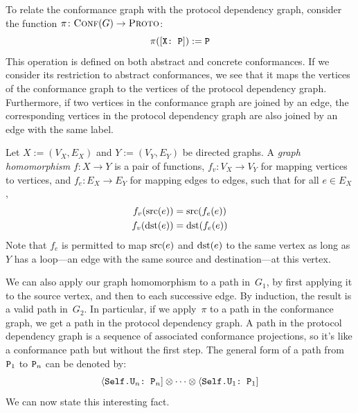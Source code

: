 \documentclass[../generics]{subfiles}
\begin{document}
To relate the conformance graph with the protocol dependency graph, consider the function $\pi\colon\textsc{Conf}({G})\rightarrow\textsc{Proto}$:
\[\pi([\texttt{X:~P}]):=\texttt{P}\]
This operation is defined on both abstract and concrete conformances. If we consider its restriction to abstract conformances, we see that it maps the vertices of the conformance graph to the vertices of the protocol dependency graph. Furthermore, if two vertices in the conformance graph are joined by an edge, the corresponding vertices in the protocol dependency graph are also joined by an edge with the same label.

\begin{definition}
Let $X:=(V_X,E_X)$ and $Y:=(V_Y,E_Y)$ be directed graphs. A \emph{graph homomorphism} $f\colon X\rightarrow Y$ is a pair of functions, $f_v\colon V_X\rightarrow V_Y$ for mapping vertices to vertices, and $f_e\colon E_X\rightarrow E_Y$ for mapping edges to edges, such that for all $e\in E_X$,
\begin{gather*}
f_v(\operatorname{src}(e)) = \operatorname{src}(f_e(e))\\
f_v(\operatorname{dst}(e)) = \operatorname{dst}(f_e(e))
\end{gather*}
Note that $f_e$ is permitted to map $\operatorname{src}(e)$ and $\operatorname{dst}(e)$ to the same vertex as long as $Y$ has a loop---an edge with the same source and destination---at this vertex.
\end{definition}

We can also apply our graph homomorphism to a path in~$G_1$, by first applying it to the source vertex, and then to each successive edge. By induction, the result is a valid path in~$G_2$. In particular, if we apply~$\pi$ to a path in the conformance graph, we get a path in the protocol dependency graph. A path in the protocol dependency graph is a sequence of associated conformance projections, so it's like a conformance path but without the first step. The general form of a path from $\texttt{P}_1$ to $\texttt{P}_n$ can be denoted by:
\[\langle\texttt{Self.$\texttt{U}_n$:~$\texttt{P}_n$}] \otimes \cdots \otimes \langle\texttt{Self.$\texttt{U}_1$:~$\texttt{P}_1$}]\]
We can now state this interesting fact.
\end{document}
